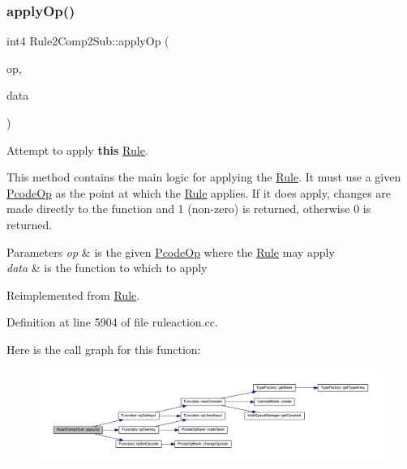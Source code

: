 \subsubsection{\texorpdfstring{applyOp()}{applyOp()}}
{\footnotesize\ttfamily int4 Rule2\+Comp2\+Sub\+::apply\+Op (\begin{DoxyParamCaption}\item[{\mbox{\hyperlink{class_pcode_op}{Pcode\+Op}} $\ast$}]{op,  }\item[{\mbox{\hyperlink{class_funcdata}{Funcdata}} \&}]{data }\end{DoxyParamCaption})\hspace{0.3cm}{\ttfamily [virtual]}}



Attempt to apply {\bfseries{this}} \mbox{\hyperlink{class_rule}{Rule}}. 

This method contains the main logic for applying the \mbox{\hyperlink{class_rule}{Rule}}. It must use a given \mbox{\hyperlink{class_pcode_op}{Pcode\+Op}} as the point at which the \mbox{\hyperlink{class_rule}{Rule}} applies. If it does apply, changes are made directly to the function and 1 (non-\/zero) is returned, otherwise 0 is returned. 
\begin{DoxyParams}{Parameters}
{\em op} & is the given \mbox{\hyperlink{class_pcode_op}{Pcode\+Op}} where the \mbox{\hyperlink{class_rule}{Rule}} may apply \\
\hline
{\em data} & is the function to which to apply \\
\hline
\end{DoxyParams}


Reimplemented from \mbox{\hyperlink{class_rule_a4e3e61f066670175009f60fb9dc60848}{Rule}}.



Definition at line 5904 of file ruleaction.\+cc.

Here is the call graph for this function\+:
\nopagebreak
\begin{figure}[H]
\begin{center}
\leavevmode
\includegraphics[width=350pt]{class_rule2_comp2_sub_a016089f19466049e949fd664649c27e4_cgraph}
\end{center}
\end{figure}
\mbox{\label{class_rule2_comp2_sub_a8c99299a5ecf4ac0b670a69a451391d9}} 
